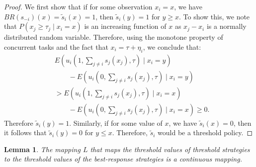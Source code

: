 \documentclass{nature}
\newtheorem{lemma}{Lemma}
\begin{document}
\begin{proof}
We first show that if for some observation $x_i=x$, we have $BR(s_{-i})(x)=\tilde{s}_i(x)=1$, then $\tilde{s}_i(y)=1$ for $y\geq x$. To show this,  we note that $P(x_j\geq \tau_j\mid x_i=x)$ is an increasing function of $x$ as $x_j-x_i$ is a normally distributed random variable. Therefore, using the monotone property of concurrent tasks and the fact that $x_i=\tau+\eta_i$, we conclude that:
\vspace{-5px}
\begin{align*}
&E(u_i(1,\sum_{j\not=i}s_j(x_j),\tau)\mid x_i=y)\\ 
&\qquad-E(u_i(0,\sum_{j\not=i}s_j(x_j),\tau)\mid x_i=y)\\ 
&>E(u_i(1,\sum_{j\not=i}s_j(x_j),\tau)\mid x_i=x)\\
&\qquad-E(u_i(0,\sum_{j\not=i}s_j(x_j),\tau)\mid x_i=x)\geq 0.
\end{align*}
Therefore $\tilde{s}_i(y)=1$. Similarly, if for some value of $x$, we have $\tilde{s}_i(x)=0$, then it follows that $\tilde{s}_i(y)=0$ for $y\leq x$. Therefore, $\tilde{s}_i$ would be a threshold policy.  
\end{proof}


\begin{lemma}
The mapping $L$ that maps the threshold values of threshold strategies to the threshold values of the best-response strategies is a continuous mapping. 
\end{lemma}
\end{document}
